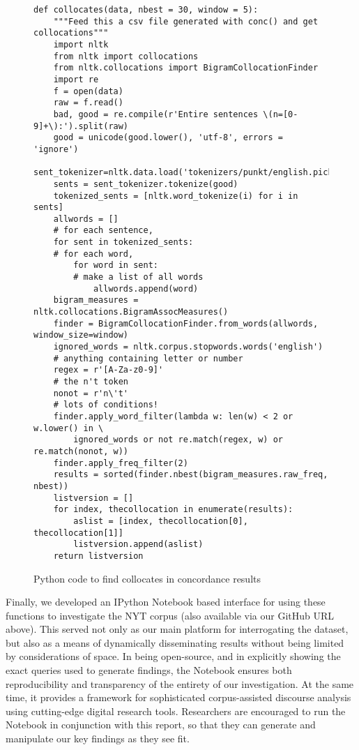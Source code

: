 \begin{figure}
\centering
\begin{minipage}[c]{.75\textwidth}
\centering
\begin{verbatim}
def collocates(data, nbest = 30, window = 5):
    """Feed this a csv file generated with conc() and get collocations"""
    import nltk
    from nltk import collocations
    from nltk.collocations import BigramCollocationFinder
    import re
    f = open(data)
    raw = f.read()
    bad, good = re.compile(r'Entire sentences \(n=[0-9]+\):').split(raw)
    good = unicode(good.lower(), 'utf-8', errors = 'ignore')
    sent_tokenizer=nltk.data.load('tokenizers/punkt/english.pickle')
    sents = sent_tokenizer.tokenize(good)
    tokenized_sents = [nltk.word_tokenize(i) for i in sents]
    allwords = []
    # for each sentence,
    for sent in tokenized_sents:
    # for each word,
        for word in sent:
        # make a list of all words
            allwords.append(word)
    bigram_measures = nltk.collocations.BigramAssocMeasures()
    finder = BigramCollocationFinder.from_words(allwords, window_size=window)
    ignored_words = nltk.corpus.stopwords.words('english')
    # anything containing letter or number
    regex = r'[A-Za-z0-9]'
    # the n't token
    nonot = r'n\'t'
    # lots of conditions!
    finder.apply_word_filter(lambda w: len(w) < 2 or w.lower() in \
        ignored_words or not re.match(regex, w) or re.match(nonot, w))
    finder.apply_freq_filter(2)
    results = sorted(finder.nbest(bigram_measures.raw_freq, nbest))
    listversion = []
    for index, thecollocation in enumerate(results):
        aslist = [index, thecollocation[0], thecollocation[1]]
        listversion.append(aslist)
    return listversion
\end{verbatim}
\caption{Python code to find collocates in concordance results}
\label{fig:code}
\end{minipage}
\end{figure}

Finally, we developed an IPython Notebook based interface for using these functions to investigate the NYT corpus (also available via our GitHub URL above). This served not only as our main platform for interrogating the dataset, but also as a means of dynamically disseminating results without being limited by considerations of space. In being open-source, and in explicitly showing the exact queries used to generate findings, the Notebook ensures both reproducibility and transparency of the entirety of our investigation. At the same time, it provides a framework for sophisticated corpus-assisted discourse analysis using cutting-edge digital research tools. Researchers are encouraged to run the Notebook in conjunction with this report, so that they can generate and manipulate our key findings as they see fit.

